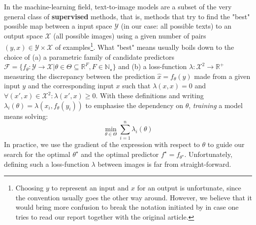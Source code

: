 \documentclass{article}
\begin{document}
\begin{appendix}
In the machine-learning field, text-to-image models are a subset of the very general class of \textbf{supervised} methods, that is, methods that try to find the "best" possible map between a input space $\mathcal{Y}$ (in our case: all possible texts) to an output space $\mathcal{X}$ (all possible images) using a given number of pairs $(y,x)\in\mathcal{Y}\times\mathcal{X}$ of examples\footnote{Choosing $y$ to represent an input and $x$ for an output is unfortunate, since the convention usually goes the other way around. However, we believe that it would bring more confusion to break the notation initiated by \citeauthor{zeroshot} in case one tries to read our report together with the original article.}.
What "best" means usually boils down to the choice of (a) a parametric family of candidate predictors $\mathcal{F}=\{f_\theta:\mathcal{Y}\to\mathcal{X}|\theta \in \Theta \subseteq \mathbb{R}^F, F\in\mathbb{N}_\star\}$ and (b) a loss-function $\lambda:\mathcal{X}^2\to\mathbb{R}^+$ measuring the discrepancy between the prediction $\hat x = f_\theta(y)$ made from a given input $y$ and the corresponding input $x$ such that $\lambda(x,x)=0$ and $\forall (x',x)\in\mathcal{X}^2:\lambda(x',x)\geqslant 0$.
With these definitions and writing $\lambda_i(\theta)=\lambda(x_i,f_\theta(y_i))$ to emphasise the dependency on $\theta$, \textit{training} a model means solving:
\begin{equation} \label{eq:minloss}
    \min_{\theta\in\Theta} \sum_{i=1}^{n} \lambda_i(\theta)
\end{equation}
In practice, we use the gradient of the expression with respect to $\theta$ to guide our search for the optimal $\theta^\star$ and the optimal predictor $f^\star=f_{\theta^\star}$.
Unfortunately, defining such a loss-function $\lambda$ between images is far from straight-forward.


\end{appendix}
\end{document}
